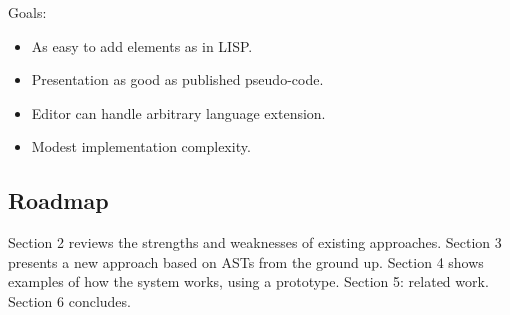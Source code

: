 Goals:
\begin{itemize}
\item As easy to add elements as in LISP.
\item Presentation as good as published pseudo-code.
\item Editor can handle arbitrary language extension.
\item Modest implementation complexity.
\end{itemize}

\subsection{Roadmap}
Section 2 reviews the strengths and weaknesses of existing approaches. Section 3 presents a new approach based on ASTs from the ground up.
Section 4 shows examples of how the system works, using a prototype.
Section 5: related work. Section 6 concludes.
